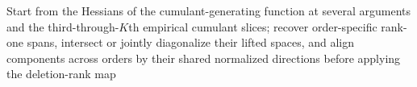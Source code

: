 Start from the Hessians of the cumulant-generating function at several arguments and the third-through-\(K\)th empirical cumulant slices; recover order-specific rank-one spans, intersect or jointly diagonalize their lifted spaces, and align components across orders by their shared normalized directions before applying the deletion-rank map